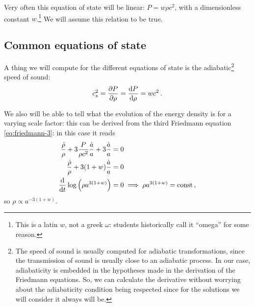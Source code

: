 \documentclass[main.tex]{subfiles}
\begin{document}
Very often this equation of state will be linear: \(P = w \rho c^2\), with a dimensionless constant \(w\).\footnote{This is a latin \(w\), not a greek \(\omega \): students historically call it ``omega'' for some reason.}
We will assume this relation to be true.



\subsection{Common equations of state}
\label{sec:common-equations-of-state}

A thing we will compute for the different equations of state is the adiabatic\footnote{The speed of sound is usually computed for adiabatic transformations, since the transmission of sound is usually close to an adiabatic process. In our case, adiabaticity is embedded in the hypotheses made in the derivation of the Friedmann equations. So, we can calculate the derivative without worrying about the adiabaticity condition being respected since for the solutions we will consider it always will be.} speed of sound: 
%
\begin{align}
c^2_{s} = \pdv{P}{\rho } = \dv{P}{\rho } = w c^2
\,.
\end{align}

We also will be able to tell what the evolution of the energy density is for a varying scale factor:
this can be derived from the third Friedmann equation \eqref{eq:friedmann-3}: in this case it reads 
%
\begin{align}
\frac{\dot{\rho}}{\rho } + 3\frac{P}{\rho c^2} \frac{\dot{a}}{a} + 3 \frac{\dot{a}}{a}  &= 0   \\
\frac{\dot{\rho}}{\rho } + 3 (1+w) \frac{\dot{a}}{a} &= 0 \\
\dv{}{t} \log \qty(\rho a^{3(1+w)}) &=0 \implies \rho a^{3(1+w)} = \text{const}
\,,
\end{align}
%
so \(\rho \propto a^{-3(1+w)}\).
\end{document}
